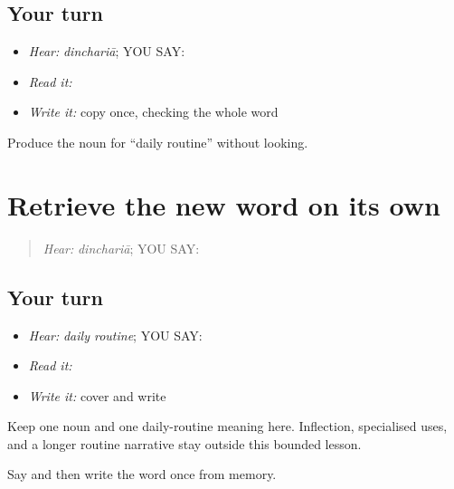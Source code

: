 \subsection*{Your turn}
\begin{itemize}
\raggedright
  \item \emph{Hear:} \emph{dinchariā}; YOU SAY: \textbf{}
  \item \emph{Read it:} \textbf{}
  \item \emph{Write it:} copy \textbf{} once, checking the whole word
\end{itemize}

\begin{tcolorbox}[breakable,colback=teal!4,colframe=teal!35!black,title={Before you move on}]
Produce the noun for “daily routine” without looking.
\end{tcolorbox}
\section[\texorpdfstring{\pa{ਦਿਨਚਰਿਆ} (dinchariyaa)}{ਦਿਨਚਰਿਆ (dinchariyaa)}]{Retrieve the new word on its own}

\label{lesson:PA-C197-dinchariya-review}



\begin{quote}
\emph{Hear:} \emph{dinchariā}; YOU SAY: \textbf{}
\end{quote}

\subsection*{Your turn}
\begin{itemize}
\raggedright
  \item \emph{Hear:} \emph{daily routine}; YOU SAY: \textbf{}
  \item \emph{Read it:} \textbf{}
  \item \emph{Write it:} cover and write \textbf{}
\end{itemize}

\begin{grammarlens}[title={Grammar Lens}]
Keep one noun and one daily-routine meaning here. Inflection, specialised uses, and a longer routine narrative stay outside this bounded lesson.
\end{grammarlens}

\begin{tcolorbox}[breakable,colback=teal!4,colframe=teal!35!black,title={Before you move on}]
Say and then write the word once from memory.
\end{tcolorbox}
